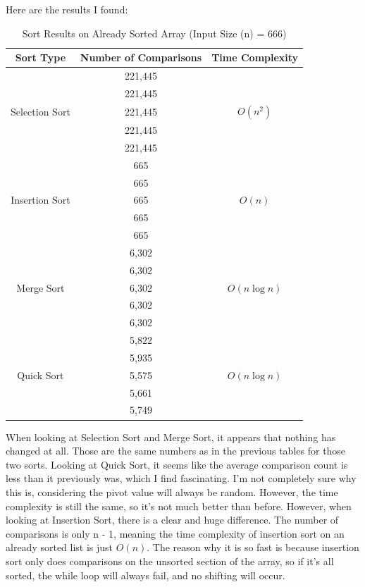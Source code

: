\documentclass[letterpaper, 10pt]{article}
\begin{document}
\vspace{-1em}
\noindent
Here are the results I found:
\begin{table}[H]
\centering
\begin{tabular}{|c|c|c|}
\hline
\textbf{Sort Type} & \textbf{Number of Comparisons} & \textbf{Time Complexity} \\
\hline
\multirow{5}{*}{Selection Sort} & 221,445  & \\
                     & 221,445  & \\
                     & 221,445  & $O(n^2)$ \\
                     & 221,445  & \\
                     & 221,445  & \\
\hline
\multirow{5}{*}{Insertion Sort} & 665  &  \\
                     & 665  &  \\
                     & 665  & $O(n)$ \\
                     & 665  &  \\
                     & 665  &  \\
\hline
\multirow{5}{*}{Merge Sort} & 6,302  &  \\
                     & 6,302  &  \\
                     & 6,302  & $O(n \log n)$ \\
                     & 6,302  &  \\
                     & 6,302  &  \\
\hline
\multirow{5}{*}{Quick Sort} & 5,822  &  \\
                     & 5,935  &  \\
                     & 5,575  & $O(n \log n)$ \\
                     & 5,661  &  \\
                     & 5,749  &  \\
\hline
\end{tabular}
\caption{Sort Results on Already Sorted Array (Input Size (n) = 666)}
\end{table}

\vspace{-1em}
\noindent
When looking at Selection Sort and Merge Sort, it appears that nothing has changed at all. Those are the same numbers as in the previous tables for those two sorts. Looking at Quick Sort, it seems like the average comparison count is less than it previously was, which I find fascinating. I'm not completely sure why this is, considering the pivot value will always be random. However, the time complexity is still the same, so it's not much better than before. However, when looking at Insertion Sort, there is a clear and huge difference. The number of comparisons is only n - 1, meaning the time complexity of insertion sort on an already sorted list is just $O(n)$. The reason why it is so fast is because insertion sort only does comparisons on the unsorted section of the array, so if it's all sorted, the while loop will always fail, and no shifting will occur.
\end{document}
